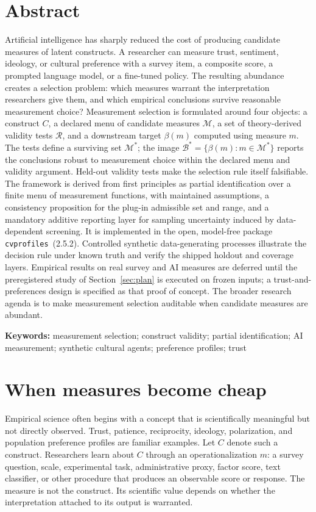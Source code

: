 \documentclass[10pt,letterpaper]{article}
\newcommand{\cvp}{\texttt{cvprofiles}}
\newcommand{\M}{\ensuremath{\mathcal{M}}}
\newcommand{\Rset}{\mathcal{R}}
\newcommand{\Bset}{\mathcal{B}}
\begin{document}
\section*{Abstract}
Artificial intelligence has sharply reduced the cost of producing candidate measures of latent constructs.
A researcher can measure trust, sentiment, ideology, or cultural preference with a survey item, a composite score, a prompted language model, or a fine-tuned policy.
The resulting abundance creates a selection problem: which measures warrant the interpretation researchers give them, and which empirical conclusions survive reasonable measurement choice?
Measurement selection is formulated around four objects: a construct $C$, a declared menu of candidate measures $\M$, a set of theory-derived validity tests $\Rset$, and a downstream target $\beta(m)$ computed using measure $m$.
The tests define a surviving set $\M^*$; the image $\Bset^*=\{\beta(m):m\in\M^*\}$ reports the conclusions robust to measurement choice within the declared menu and validity argument.
Held-out validity tests make the selection rule itself falsifiable.
The framework is derived from first principles as partial identification over a finite menu of measurement functions, with maintained assumptions, a consistency proposition for the plug-in admissible set and range, and a mandatory additive reporting layer for sampling uncertainty induced by data-dependent screening.
It is implemented in the open, model-free package \cvp{}~(2.5.2).
Controlled synthetic data-generating processes illustrate the decision rule under known truth and verify the shipped holdout and coverage layers.
Empirical results on real survey and AI measures are deferred until the preregistered study of Section~\ref{sec:plan} is executed on frozen inputs; a trust-and-preferences design is specified as that proof of concept.
The broader research agenda is to make measurement selection auditable when candidate measures are abundant.

\noindent\textbf{Keywords:}
measurement selection; construct validity; partial identification; AI measurement; synthetic cultural agents; preference profiles; trust

\section{When measures become cheap}
Empirical science often begins with a concept that is scientifically meaningful but not directly observed.
Trust, patience, reciprocity, ideology, polarization, and population preference profiles are familiar examples.
Let $C$ denote such a construct.
Researchers learn about $C$ through an operationalization $m$: a survey question, scale, experimental task, administrative proxy, factor score, text classifier, or other procedure that produces an observable score or response.
The measure is not the construct.
Its scientific value depends on whether the interpretation attached to its output is warranted.
\end{document}
